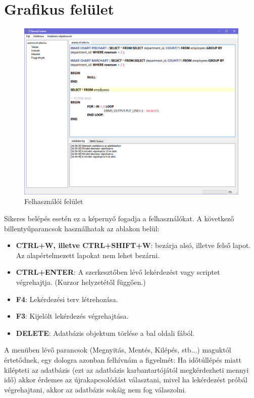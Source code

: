 \documentclass{elteikthesis}
\begin{document}
\section{Grafikus felület}
\begin{figure}[ht]
    \includegraphics[width=1.0\textwidth]{gui}
 \caption{Felhasználói felület}
\end{figure}
Sikeres belépés esetén ez a képernyő fogadja a felhasználókat.
A következő billentyűparancsok használhatak az ablakon belül:
\begin{itemize}
  \item \textbf{CTRL+W, illetve CTRL+SHIFT+W}: bezárja alsó, illetve felső lapot. Az alapértelmezett lapokat nem lehet bezárni.
  \item \textbf{CTRL+ENTER}: A szerkesztőben lévő lekérdezést vagy scriptet végrehajtja. (Kurzor helyzetétől függően.)
  \item \textbf{F4}: Lekérdezési terv létrehozása.
  \item \textbf{F3}: Kijelölt lekérdezés végrehajtása.
  \item \textbf{DELETE}: Adatbázis objektum törlése a bal oldali fából.
\end{itemize}

A menüben lévő parancsok (Megnyitás, Mentés, Kilépés, stb...) maguktól értetődnek, egy dologra azonban
felhívnám a figyelmét: Ha időtúllépés miatt kilépteti az adatbázis (ezt az adatbázis karbantartójától megkérdezheti mennyi idő) akkor
érdemes az újrakapcsolódást választani, mivel ha lekérdezést próbál végrehajtani, akkor az adatbázis sokáig nem fog válaszolni.
\end{document}
